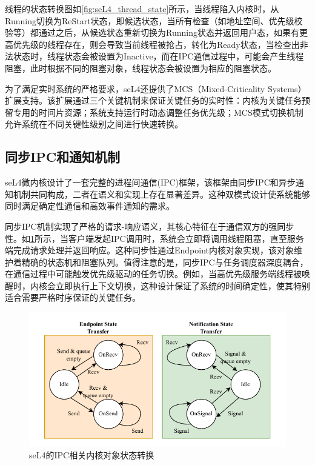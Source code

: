 线程的状态转换图如\ref{fig:seL4_thread_state}所示，当线程陷入内核时，从Running切换为ReStart状态，即候选状态，当所有检查（如地址空间、优先级校验等）都通过之后，从候选状态重新切换为Running状态并返回用户态，如果有更高优先级的线程存在，则会导致当前线程被抢占，转化为Ready状态，当检查出非法状态时，线程状态会被设置为Inactive，而在IPC通信过程中，可能会产生线程阻塞，此时根据不同的阻塞对象，线程状态会被设置为相应的阻塞状态。


为了满足实时系统的严格要求，seL4还提供了MCS（Mixed-Criticality Systems）扩展\cite{lyons2018scheduling}支持。该扩展通过三个关键机制来保证关键任务的实时性：内核为关键任务预留专用的时间片资源；系统支持运行时动态调整任务优先级；MCS模式切换机制允许系统在不同关键性级别之间进行快速转换。

\subsection{同步IPC和通知机制}
\label{sec:sel4_ipc}
seL4微内核设计了一套完整的进程间通信(IPC)框架，该框架由同步IPC和异步通知机制共同构成，二者在语义和实现上存在显著差异。这种双模式设计使系统能够同时满足确定性通信和高效事件通知的需求。


同步IPC机制实现了严格的请求-响应语义，其核心特征在于通信双方的强同步性。如\ref{fig:seL4_ipc_state}所示，当客户端发起IPC调用时，系统会立即将调用线程阻塞，直至服务端完成请求处理并返回响应。这种同步性通过Endpoint内核对象实现，该对象维护着精确的状态机和阻塞队列。值得注意的是，同步IPC与任务调度器深度耦合，在通信过程中可能触发优先级驱动的任务切换。例如，当高优先级服务端线程被唤醒时，内核会立即执行上下文切换，这种设计保证了系统的时间确定性，使其特别适合需要严格时序保证的关键任务。

\begin{figure}[htbp]
  \centering
  \includegraphics{figures/seL4_ipc_state.drawio.pdf}
  \caption{seL4的IPC相关内核对象状态转换}\label{fig:seL4_ipc_state}
\end{figure}

